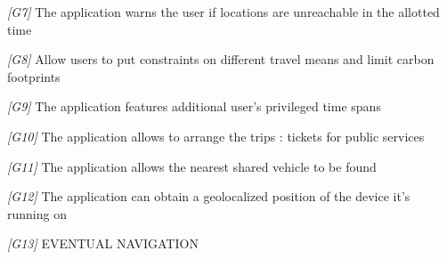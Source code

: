                   
\item \textit{[G7]} The application warns the user if locations are unreachable in the allotted time 

\item \textit{[G8]} Allow users to put constraints on different travel means and limit carbon footprints

\item \textit{[G9]} The application features additional user’s privileged time spans 

\item \textit{[G10]} The application allows to arrange the trips : tickets for public services

\item \textit{[G11]} The application allows the nearest shared vehicle to be found

\item \textit{[G12]} The application can obtain a geolocalized position of the device it's running on

\item \textit{[G13]} EVENTUAL NAVIGATION


    
